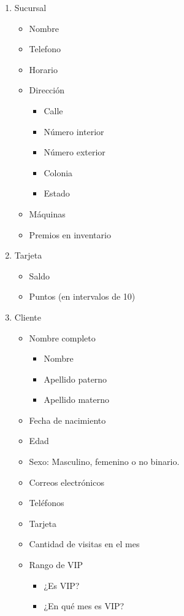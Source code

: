 \begin{enumerate}
    \item Sucursal
    \begin{itemize}
    \item Nombre
    \item Telefono
    \item Horario
    \item Dirección      
        \begin{itemize}
            \item Calle
            \item Número interior
            \item Número exterior
            \item Colonia
            \item Estado
        \end{itemize}
        \item Máquinas
        \item Premios en inventario
    \end{itemize}

    \item Tarjeta
    \begin{itemize}
        \item Saldo 
        \item Puntos (en intervalos de 10)
    \end{itemize}

    \item Cliente
    \begin{itemize}
        \item Nombre completo
        \begin{itemize}
            \item Nombre
            \item Apellido paterno
            \item Apellido materno
        \end{itemize}
        \item Fecha de nacimiento
        \item Edad
        \item Sexo: Masculino, femenino o no binario.
        \item Correos electrónicos
        \item Teléfonos
        \item Tarjeta
        \item Cantidad de visitas en el mes
        \item Rango de VIP
        \begin{itemize}
            \item ¿Es VIP?
            \item ¿En qué mes es VIP?
        \end{itemize}
    \end{itemize}


\end{enumerate}
